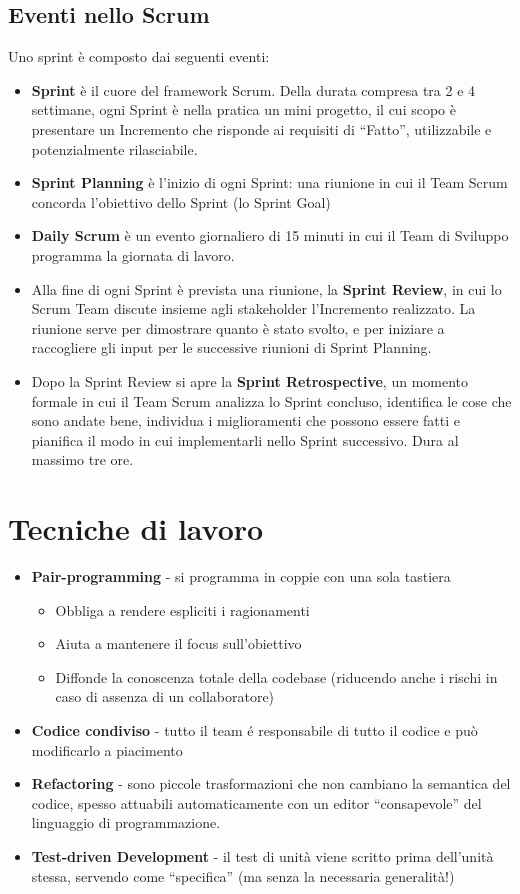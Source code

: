 \documentclass[a4paper,12pt,titlepage,oneside]{book}
\begin{document}
\subsection{Eventi nello Scrum}
    Uno sprint è composto dai seguenti eventi:
\begin{itemize}
    \item \textbf{Sprint} è il cuore del framework Scrum. Della durata compresa tra 2 e 4 settimane, ogni Sprint è nella pratica un mini progetto, il cui scopo è presentare un Incremento che risponde ai requisiti di “Fatto”, utilizzabile e potenzialmente rilasciabile.
    \item \textbf{Sprint Planning} è l’inizio di ogni Sprint: una riunione in cui il Team Scrum concorda l’obiettivo dello Sprint (lo Sprint Goal)
    \item \textbf{Daily Scrum} è un evento giornaliero di 15 minuti in cui il Team di Sviluppo programma la giornata di lavoro.
    \item Alla fine di ogni Sprint è prevista una riunione, la \textbf{Sprint Review}, in cui lo Scrum Team discute insieme agli stakeholder l’Incremento realizzato. La riunione serve per dimostrare quanto è stato svolto, e per iniziare a raccogliere gli input per le successive riunioni di Sprint Planning. 
    \item Dopo la Sprint Review si apre la \textbf{Sprint Retrospective}, un momento formale in cui il Team Scrum analizza lo Sprint concluso, identifica le cose che sono andate bene, individua i miglioramenti che possono essere fatti e pianifica il modo in cui implementarli nello Sprint successivo. Dura al massimo tre ore.
\end{itemize}

\section{Tecniche di lavoro}

\begin{itemize}
    \item \textbf{Pair-programming} - si programma in coppie con una sola tastiera
    \begin{itemize}
        \item Obbliga a rendere espliciti i ragionamenti
        \item Aiuta a mantenere il focus sull’obiettivo
        \item Diffonde la conoscenza totale della codebase (riducendo anche i rischi in caso di assenza di un collaboratore)
    \end{itemize}
    \item \textbf{Codice condiviso} - tutto il team é responsabile di tutto il codice e può modificarlo a piacimento
    \item \textbf{Refactoring} - sono piccole trasformazioni che non cambiano la semantica del codice, spesso attuabili automaticamente con un editor “consapevole” del linguaggio di programmazione.
    \item \textbf{Test-driven Development} - il test di unità viene scritto prima dell’unità stessa, servendo come “specifica” (ma senza la necessaria generalità!)
\end{itemize}
\end{document}
